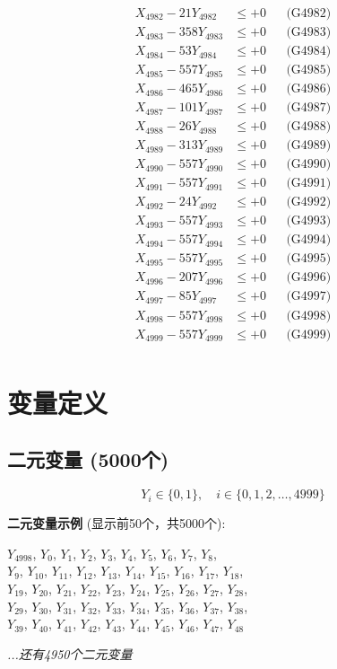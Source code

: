 \documentclass[a4paper,10pt]{article}
\begin{document}
{\begin{align}
X_{4982} - 21Y_{4982} &\leq +0 && \text{(G4982)} \\
X_{4983} - 358Y_{4983} &\leq +0 && \text{(G4983)} \\
X_{4984} - 53Y_{4984} &\leq +0 && \text{(G4984)} \\
X_{4985} - 557Y_{4985} &\leq +0 && \text{(G4985)} \\
X_{4986} - 465Y_{4986} &\leq +0 && \text{(G4986)} \\
X_{4987} - 101Y_{4987} &\leq +0 && \text{(G4987)} \\
X_{4988} - 26Y_{4988} &\leq +0 && \text{(G4988)} \\
X_{4989} - 313Y_{4989} &\leq +0 && \text{(G4989)} \\
X_{4990} - 557Y_{4990} &\leq +0 && \text{(G4990)} \\
\allowbreak
X_{4991} - 557Y_{4991} &\leq +0 && \text{(G4991)} \\
X_{4992} - 24Y_{4992} &\leq +0 && \text{(G4992)} \\
X_{4993} - 557Y_{4993} &\leq +0 && \text{(G4993)} \\
X_{4994} - 557Y_{4994} &\leq +0 && \text{(G4994)} \\
X_{4995} - 557Y_{4995} &\leq +0 && \text{(G4995)} \\
X_{4996} - 207Y_{4996} &\leq +0 && \text{(G4996)} \\
X_{4997} - 85Y_{4997} &\leq +0 && \text{(G4997)} \\
X_{4998} - 557Y_{4998} &\leq +0 && \text{(G4998)} \\
X_{4999} - 557Y_{4999} &\leq +0 && \text{(G4999)} \\
\end{align}
}

\section{变量定义}

\subsection{二元变量 (5000个)}

\begin{equation}
Y_i \in \{0,1\}, \quad i \in \{0, 1, 2, \ldots, 4999\}
\end{equation}

\textbf{二元变量示例} (显示前50个，共5000个):

{\small
$Y_{4998}$, $Y_{0}$, $Y_{1}$, $Y_{2}$, $Y_{3}$, $Y_{4}$, $Y_{5}$, $Y_{6}$, $Y_{7}$, $Y_{8}$, \\
$Y_{9}$, $Y_{10}$, $Y_{11}$, $Y_{12}$, $Y_{13}$, $Y_{14}$, $Y_{15}$, $Y_{16}$, $Y_{17}$, $Y_{18}$, \\
$Y_{19}$, $Y_{20}$, $Y_{21}$, $Y_{22}$, $Y_{23}$, $Y_{24}$, $Y_{25}$, $Y_{26}$, $Y_{27}$, $Y_{28}$, \\
$Y_{29}$, $Y_{30}$, $Y_{31}$, $Y_{32}$, $Y_{33}$, $Y_{34}$, $Y_{35}$, $Y_{36}$, $Y_{37}$, $Y_{38}$, \\
$Y_{39}$, $Y_{40}$, $Y_{41}$, $Y_{42}$, $Y_{43}$, $Y_{44}$, $Y_{45}$, $Y_{46}$, $Y_{47}$, $Y_{48}$

\textit{...还有4950个二元变量}
}
\end{document}
